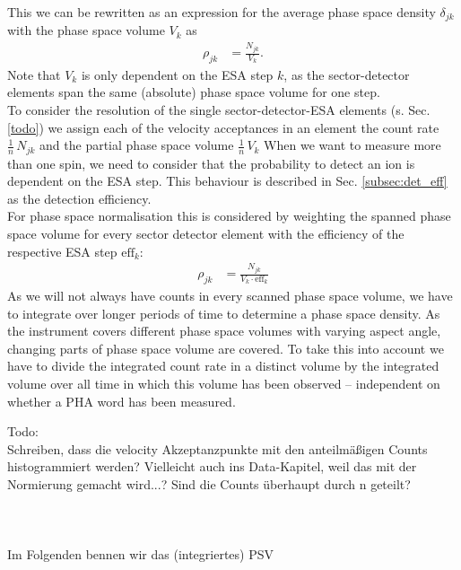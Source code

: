 This we can be rewritten as an expression for the average phase space density $\delta_{jk}$ with the phase space volume $V_{k}$ as 
\begin{align*}
\rho_{jk} &= \frac{N_{jk}}{V_{k}}.
\end{align*}
Note that $V_{k}$ is only dependent on the ESA step $k$, as the sector-detector elements span the same (absolute) phase space volume for one step.\\
To consider the resolution of the single sector-detector-ESA elements (s. Sec. \ref{todo}) we assign each of the velocity acceptances in an element the count rate $\frac{1}{n}\, N_{jk}$ and the partial phase space volume $\frac{1}{n} \,V_{k}$
When we want to measure more than one spin, we need to consider that the probability to detect an ion is dependent on the ESA step. This behaviour is described in Sec. \ref{subsec:det_eff} as the detection efficiency.\\
For phase space normalisation this is considered by weighting the spanned phase space volume for every sector detector element with the efficiency of the respective ESA step $\mathrm{eff}_k$: 
\begin{align*}
\rho_{jk} &= \frac{N_{jk}}{V_{k}\cdot \mathrm{eff}_k}
\end{align*}
As we will not always have counts in every scanned phase space volume, we have to integrate over longer periods of time to determine a phase space density.
As the instrument covers different phase space volumes with varying aspect angle, changing parts of phase space volume are covered. To take this into account we have to divide the integrated count rate in a distinct volume by the integrated volume over all time in which this volume has been observed -- independent on whether a PHA word has been measured.

Todo:\\
Schreiben, dass die velocity Akzeptanzpunkte mit den anteilmäßigen Counts histogrammiert werden? Vielleicht auch ins Data-Kapitel, weil das mit der Normierung gemacht wird...? Sind die Counts überhaupt durch n geteilt?\\ \\
\\ \\
Im Folgenden bennen wir das (integriertes) PSV


